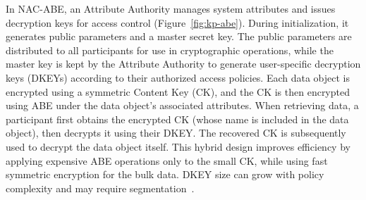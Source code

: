 In NAC-ABE, an Attribute Authority manages system attributes and issues decryption keys for access control (Figure~\ref{fig:kp-abe}). During initialization, it generates public parameters and a master secret key. The public parameters are distributed to all participants for use in cryptographic operations, while the master key is kept by the Attribute Authority to generate user-specific decryption keys (DKEYs) according to their authorized access policies.  Each data object is encrypted using a symmetric Content Key (CK), and the CK is then encrypted using ABE under the data object’s associated attributes. When retrieving data, a participant first obtains the encrypted CK (whose name is included in the data object), then decrypts it using their DKEY. The recovered CK is subsequently used to decrypt the data object itself. This hybrid design improves efficiency by applying expensive ABE operations only to the small CK, while using fast symmetric encryption for the bulk data. DKEY size can grow with policy complexity and may require segmentation~\cite{dulal2023nac-abe}.




